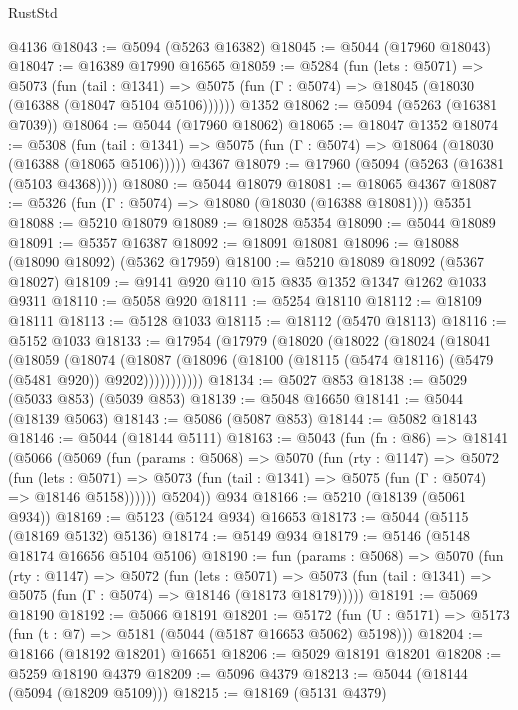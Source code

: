\begin{lexlean}{RustStd}
\begin{coremodule}
    @4136
@18043 := @5094 (@5263 @16382)
@18045 := @5044 (@17960 @18043)
@18047 := @16389 @17990 @16565
@18059 := @5284
    (fun (lets : @5071) =>
    @5073
      (fun (tail : @1341) =>
      @5075 (fun (Γ : @5074) => @18045 (@18030 (@16388 (@18047 @5104 @5106))))))
    @1352
@18062 := @5094 (@5263 (@16381 @7039))
@18064 := @5044 (@17960 @18062)
@18065 := @18047 @1352
@18074 := @5308
    (fun (tail : @1341) => @5075 (fun (Γ : @5074) => @18064 (@18030 (@16388 (@18065 @5106)))))
    @4367
@18079 := @17960 (@5094 (@5263 (@16381 (@5103 @4368))))
@18080 := @5044 @18079
@18081 := @18065 @4367
@18087 := @5326 (fun (Γ : @5074) => @18080 (@18030 (@16388 @18081))) @5351
@18088 := @5210 @18079
@18089 := @18028 @5354
@18090 := @5044 @18089
@18091 := @5357 @16387
@18092 := @18091 @18081
@18096 := @18088 (@18090 @18092) (@5362 @17959)
@18100 := @5210 @18089 @18092 (@5367 @18027)
@18109 := @9141 @920 @110 @15 @835 @1352 @1347 @1262 @1033 @9311
@18110 := @5058 @920
@18111 := @5254 @18110
@18112 := @18109 @18111
@18113 := @5128 @1033
@18115 := @18112 (@5470 @18113)
@18116 := @5152 @1033
@18133 := @17954
    (@17979
      (@18020
        (@18022
          (@18024
            (@18041
              (@18059
                (@18074
                  (@18087
                    (@18096 (@18100 (@18115 (@5474 @18116) (@5479 (@5481 @920)) @9202)))))))))))
@18134 := @5027 @853
@18138 := @5029 (@5033 @853) (@5039 @853)
@18139 := @5048 @16650
@18141 := @5044 (@18139 @5063)
@18143 := @5086 (@5087 @853)
@18144 := @5082 @18143
@18146 := @5044 (@18144 @5111)
@18163 := @5043
    (fun (fn : @86) =>
    @18141
      (@5066
        (@5069
          (fun (params : @5068) =>
          @5070
            (fun (rty : @1147) =>
            @5072
              (fun (lets : @5071) =>
              @5073 (fun (tail : @1341) => @5075 (fun (Γ : @5074) => @18146 @5158))))))
        @5204))
    @934
@18166 := @5210 (@18139 (@5061 @934))
@18169 := @5123 (@5124 @934) @16653
@18173 := @5044 (@5115 (@18169 @5132) @5136)
@18174 := @5149 @934
@18179 := @5146 (@5148 @18174 @16656 @5104 @5106)
@18190 := fun (params : @5068) =>
  @5070
    (fun (rty : @1147) =>
    @5072
      (fun (lets : @5071) =>
      @5073 (fun (tail : @1341) => @5075 (fun (Γ : @5074) => @18146 (@18173 @18179)))))
@18191 := @5069 @18190
@18192 := @5066 @18191
@18201 := @5172
    (fun (U : @5171) => @5173 (fun (t : @7) => @5181 (@5044 (@5187 @16653 @5062) @5198)))
@18204 := @18166 (@18192 @18201) @16651
@18206 := @5029 @18191 @18201
@18208 := @5259 @18190 @4379
@18209 := @5096 @4379
@18213 := @5044 (@18144 (@5094 (@18209 @5109)))
@18215 := @18169 (@5131 @4379)

\end{coremodule}
\end{lexlean}
